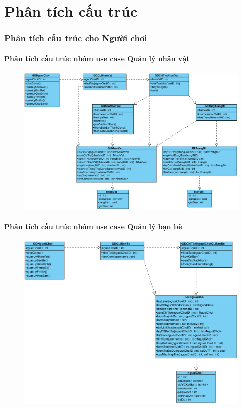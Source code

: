 \documentclass[3p]{elsarticle}
\begin{document}
\newpage
\part{Phân tích cấu trúc}
\section{Phân tích cấu trúc cho Người chơi}
\subsection{Phân tích cấu trúc nhóm use case Quản lý nhân vật}
\begin{figure}[!htbp]
	\hspace*{-.5in}
	\centering
	\includegraphics[scale=.55]{images/structure-pdfs/gamer/CharacterManagement.pdf}
\end{figure}
\newpage
\subsection{Phân tích cấu trúc nhóm use case Quản lý bạn bè}
\begin{figure}[!htbp]
	\hspace*{-.5in}
	\centering
	\includegraphics[scale=.55]{images/structure-pdfs/gamer/FriendManagement.pdf}
\end{figure}
\newpage
\end{document}
